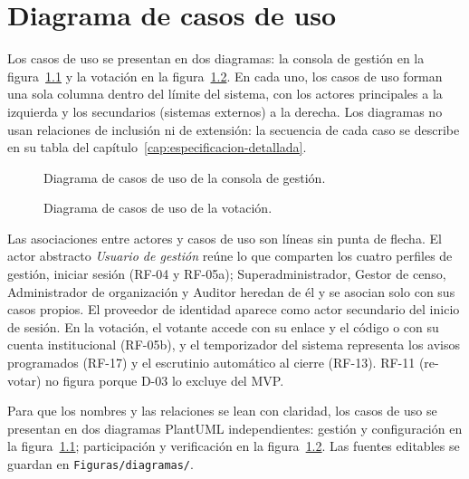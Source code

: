 \chapter{Diagrama de casos de uso}
\label{cap:refactorizacion-diagrama}

\ifdcunuevo

Los casos de uso se presentan en dos diagramas: la consola de gestión en la
figura~\ref{fig:casos-uso-gestion} y la votación en la
figura~\ref{fig:casos-uso-votacion}. En cada uno, los casos de uso forman una
sola columna dentro del límite del sistema, con los actores principales a la
izquierda y los secundarios (sistemas externos) a la derecha. Los diagramas no
usan relaciones de inclusión ni de extensión: la secuencia de cada caso se
describe en su tabla del capítulo~\ref{cap:especificacion-detallada}.

\begin{figure}[p]
  \centering
  \resizebox{!}{0.85\textheight}{}
  \caption{Diagrama de casos de uso de la consola de gestión.}
  \label{fig:casos-uso-gestion}
\end{figure}

\begin{figure}[p]
  \centering
  \resizebox{0.85\textwidth}{!}{}
  \caption{Diagrama de casos de uso de la votación.}
  \label{fig:casos-uso-votacion}
\end{figure}

Las asociaciones entre actores y casos de uso son líneas sin punta de flecha.
El actor abstracto \emph{Usuario de gestión} reúne lo que comparten los cuatro
perfiles de gestión, iniciar sesión (RF-04 y RF-05a); Superadministrador,
Gestor de censo, Administrador de organización y Auditor heredan de él y se
asocian solo con sus casos propios. El proveedor de identidad aparece como
actor secundario del inicio de sesión. En la votación, el votante accede con
su enlace y el código o con su cuenta institucional (RF-05b), y el
temporizador del sistema representa los avisos programados (RF-17) y el
escrutinio automático al cierre (RF-13). RF-11 (re-votar) no figura porque
D-03 lo excluye del MVP.
\else


Para que los nombres y las relaciones se lean con claridad, los casos de uso
se presentan en dos diagramas PlantUML independientes: gestión y
configuración en la figura~\ref{fig:casos-uso-gestion}; participación y
verificación en la figura~\ref{fig:casos-uso-votacion}. Las fuentes editables
se guardan en \texttt{Figuras/diagramas/}.

